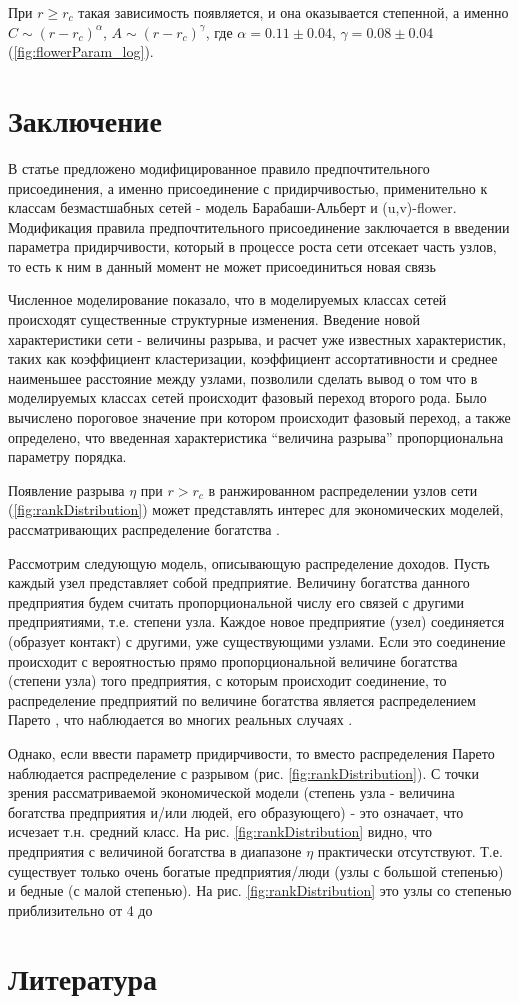 \documentclass[10pt,aps,pra]{revtex4-1}
\begin{document}
        При $r \geq r_c$ такая зависимость появляется, и она оказывается степенной, а именно $C \sim {(r-r_c)}^\alpha$, $A \sim {(r-r_c)}^\gamma$, где $\alpha = 0.11 \pm 0.04$, $\gamma = 0.08 \pm 0.04$ (\ref{fig:flowerParam_log}).

\section{Заключение}

    В статье предложено модифицированное правило предпочтительного присоединения, а именно присоединение с придирчивостью, применительно к классам безмастшабных сетей - модель Барабаши-Альберт и (u,v)-flower. Модификация правила предпочтительного присоединение заключается в введении параметра придирчивости, который в процессе роста сети отсекает часть узлов,  то есть к ним в данный момент не может присоединиться новая связь

    Численное моделирование показало, что в моделируемых классах сетей происходят существенные структурные изменения. Введение новой характеристики сети - величины разрыва, и расчет уже известных характеристик, таких как коэффициент кластеризации, коэффициент ассортативности и среднее наименьшее расстояние между узлами, позволили сделать вывод о том что в моделируемых классах сетей происходит фазовый переход второго рода. Было вычислено пороговое значение при котором происходит фазовый переход, а также определено, что введенная характеристика ``величина разрыва'' пропорциональна параметру порядка.

    Появление разрыва $\eta$ при $r>r_c$ в ранжированном распределении узлов сети (\ref{fig:rankDistribution}) может представлять интерес для экономических моделей, рассматривающих распределение богатства \cite{Economics2}.

    Рассмотрим следующую модель, описывающую распределение доходов. Пусть каждый узел представляет собой предприятие. Величину богатства данного предприятия будем считать пропорциональной числу его связей с другими предприятиями, т.е. степени узла. Каждое новое предприятие (узел) соединяется (образует контакт) с другими, уже существующими узлами. Если это соединение происходит с вероятностью прямо пропорциональной величине богатства (степени узла) того предприятия, с которым происходит соединение, то распределение предприятий по величине богатства является распределением Парето \cite{Economics2, Economics1}, что наблюдается во многих реальных случаях \cite{Economics1}.

    Однако, если ввести параметр придирчивости, то вместо распределения Парето наблюдается распределение с разрывом (рис. \ref{fig:rankDistribution}). С точки зрения рассматриваемой экономической модели (степень узла - величина богатства предприятия и/или людей, его образующего) - это означает, что исчезает т.н. средний класс. На рис. \ref{fig:rankDistribution} видно, что предприятия с величиной богатства в диапазоне $\eta$ практически отсутствуют. Т.е. существует только очень богатые предприятия/люди (узлы  с большой степенью) и бедные (с малой степенью). На рис. \ref{fig:rankDistribution} это узлы со степенью приблизительно от 4 до 

\section{Литература}

 

\end{document}
